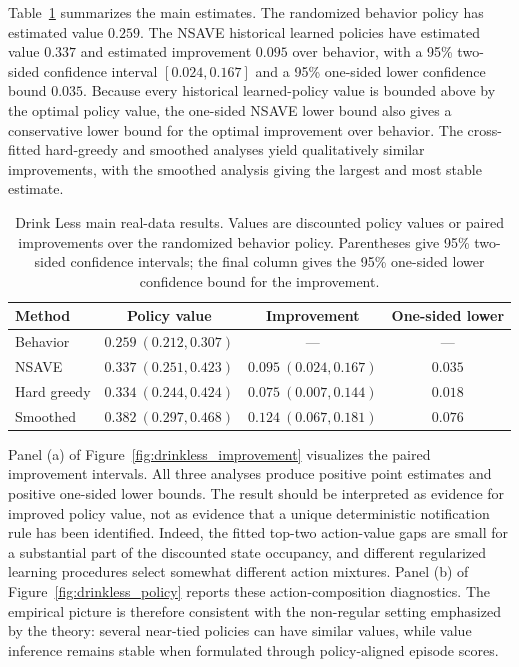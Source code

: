 \documentclass[12pt]{article}
\theoremstyle{remark}\newtheorem{remark}[theorem]{Remark}\theoremstyle{plain}
\newcommand{\NA}{---}
\begin{document}
Table~\ref{tab:drinkless_main} summarizes the main estimates.
The randomized behavior policy has estimated value $0.259$.
The NSAVE historical learned policies have estimated value $0.337$ and estimated improvement $0.095$ over behavior, with a 95\% two-sided confidence interval $[0.024,0.167]$ and a 95\% one-sided lower confidence bound $0.035$.
Because every historical learned-policy value is bounded above by the optimal policy value, the one-sided NSAVE lower bound also gives a conservative lower bound for the optimal improvement over behavior.
The cross-fitted hard-greedy and smoothed analyses yield qualitatively similar improvements, with the smoothed analysis giving the largest and most stable estimate.

\begin{table}[!htp]
\centering
\small
\caption{Drink Less main real-data results.  Values are discounted policy values or paired improvements over the randomized behavior policy.  Parentheses give 95\% two-sided confidence intervals; the final column gives the 95\% one-sided lower confidence bound for the improvement.}
\label{tab:drinkless_main}
\begin{tabular}{lccc}
\toprule
Method & Policy value & Improvement & One-sided lower \\
\midrule
Behavior & $0.259\ (0.212,0.307)$ & \NA & \NA \\
NSAVE & $0.337\ (0.251,0.423)$ & $0.095\ (0.024,0.167)$ & $0.035$ \\
Hard greedy & $0.334\ (0.244,0.424)$ & $0.075\ (0.007,0.144)$ & $0.018$ \\
Smoothed & $0.382\ (0.297,0.468)$ & $0.124\ (0.067,0.181)$ & $0.076$ \\
\bottomrule
\end{tabular}
\end{table}

Panel (a) of Figure~\ref{fig:drinkless_improvement} visualizes the paired improvement intervals.
All three analyses produce positive point estimates and positive one-sided lower bounds.
The result should be interpreted as evidence for improved policy value, not as evidence that a unique deterministic notification rule has been identified.
Indeed, the fitted top-two action-value gaps are small for a substantial part of the discounted state occupancy, and different regularized learning procedures select somewhat different action mixtures.
Panel (b) of Figure~\ref{fig:drinkless_policy} reports these action-composition diagnostics.
The empirical picture is therefore consistent with the non-regular setting emphasized by the theory: several near-tied policies can have similar values, while value inference remains stable when formulated through policy-aligned episode scores.
\end{document}
